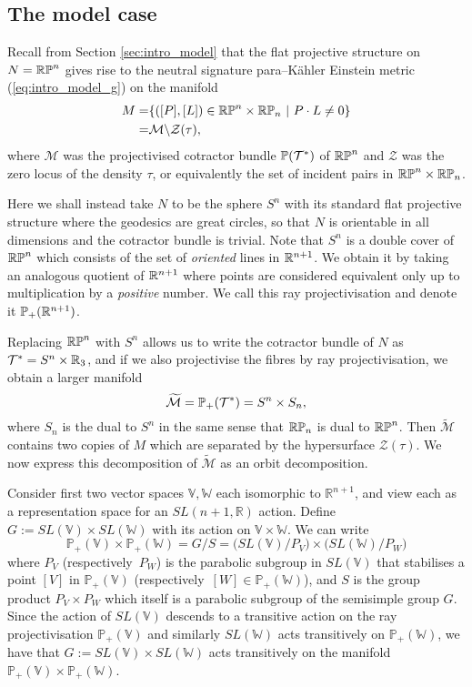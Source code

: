 \subsection{The model case}

Recall from Section \ref{sec:intro_model} that the flat projective structure on $N=\mathbb{RP}^n$ gives rise to 
the neutral signature para--K\"ahler Einstein metric (\ref{eq:intro_model_g}) on the manifold
\begin{align*}
M=&\{([P],[L])\in\mathbb{RP}^n\times\mathbb{RP}_n\ |\ P\cdot L\neq 0\} \\
=& \mathcal{M}\backslash\mathcal{Z}(\tau),
\end{align*}
where $\mathcal{M}$ was the projectivised cotractor bundle $\mathbb{P}(\mathcal{T}^*)$ of $\mathbb{RP}^n$ and $\mathcal{Z}$ was the zero locus of the density $\tau$, or equivalently the set of incident pairs in $\mathbb{RP}^n\times\mathbb{RP}_n$.

Here we shall instead take $N$ to be the sphere $S^n$ with its standard flat projective structure where the geodesics are great circles, so that $N$ is orientable in all dimensions and the cotractor bundle is trivial. Note that $S^n$ is a double cover of $\mathbb{RP}^n$ which consists of the set of \textit{oriented} lines in $\mathbb{R}^{n+1}$. We obtain it by taking an analogous quotient of $\mathbb{R}^{n+1}$ where points are considered equivalent only up to multiplication by a \textit{positive} number. We call this ray projectivisation and denote it $\mathbb{P}_+(\mathbb{R}^{n+1})$.

Replacing $\mathbb{RP}^n$ with $S^n$ allows us to write the cotractor bundle of $N$ as $\mathcal{T}^*=S^n\times\mathbb{R}_3$, and if we also projectivise the fibres by ray projectivisation, we obtain a larger manifold
\[
\widetilde{\mathcal{M}}=\mathbb{P}_+(\mathcal{T}^*)=S^n\times S_n,
\]
where $S_n$ is the dual to $S^n$ in the same sense that $\mathbb{RP}_n$ is dual to $\mathbb{RP}^n$. Then $\widetilde{\mathcal{M}}$ contains two copies of $M$ which are separated by the hypersurface $\mathcal{Z}(\tau)$. We now express this decomposition of $\widetilde{\mathcal{M}}$ as an orbit decomposition.

Consider first two vector spaces $\mathbb{V},\mathbb{W}$ each isomorphic to $\mathbb{R}^{n+1}$, and view each as a representation space for an $SL(n+1,\mathbb{R})$ action. Define $G:= SL(\mathbb{V})\times SL(\mathbb{W})$ with its action on $\mathbb{V}\times \mathbb{W}$. We can write 
\[
\mathbb{P}_+(\mathbb{V}) \times \mathbb{P}_+(\mathbb{W})=G/S=\big( SL(\mathbb{V})/P_V \big)\times \big( SL(\mathbb{W})/P_W \big)
\]
where $P_V$ (respectively\ $P_W$) is the parabolic subgroup in $SL(\mathbb{V})$
that stabilises a point $[V]$ in $\mathbb{P}_+(\mathbb{V})$ (respectively\ $[W] \in \mathbb{P}_+(\mathbb{W})$), and $S$ is the group product $P_V\times P_W$ which itself is a
parabolic subgroup of the semisimple group $G$.
Since the action of $SL(\mathbb{V})$ descends to a transitive action on the ray projectivisation $\mathbb{P}_+(\mathbb{V})$ and similarly $SL(\mathbb{W})$ acts
transitively on $\mathbb{P}_+(\mathbb{W})$, we have that $G:= SL(\mathbb{V})\times SL(\mathbb{W})$ acts transitively on the manifold $\mathbb{P}_+(\mathbb{V}) \times \mathbb{P}_+(\mathbb{W})$.

